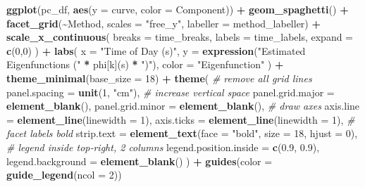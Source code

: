 \documentclass[
]{article}
\newenvironment{Shaded}{\begin{snugshade}}{\end{snugshade}}
\newcommand{\AttributeTok}[1]{\textcolor[rgb]{0.13,0.29,0.53}{#1}}
\newcommand{\CommentTok}[1]{\textcolor[rgb]{0.56,0.35,0.01}{\textit{#1}}}
\newcommand{\DecValTok}[1]{\textcolor[rgb]{0.00,0.00,0.81}{#1}}
\newcommand{\FloatTok}[1]{\textcolor[rgb]{0.00,0.00,0.81}{#1}}
\newcommand{\FunctionTok}[1]{\textcolor[rgb]{0.13,0.29,0.53}{\textbf{#1}}}
\newcommand{\NormalTok}[1]{#1}
\newcommand{\SpecialCharTok}[1]{\textcolor[rgb]{0.81,0.36,0.00}{\textbf{#1}}}
\newcommand{\StringTok}[1]{\textcolor[rgb]{0.31,0.60,0.02}{#1}}
\begin{document}
\begin{Shaded}
\begin{Highlighting}[]
\FunctionTok{ggplot}\NormalTok{(pc\_df, }\FunctionTok{aes}\NormalTok{(}\AttributeTok{y =}\NormalTok{ curve, }\AttributeTok{color =}\NormalTok{ Component)) }\SpecialCharTok{+}
  \FunctionTok{geom\_spaghetti}\NormalTok{() }\SpecialCharTok{+}
  \FunctionTok{facet\_grid}\NormalTok{(}\SpecialCharTok{\textasciitilde{}}\NormalTok{Method, }\AttributeTok{scales =} \StringTok{"free\_y"}\NormalTok{, }\AttributeTok{labeller =}\NormalTok{ method\_labeller) }\SpecialCharTok{+}
  \FunctionTok{scale\_x\_continuous}\NormalTok{(}
    \AttributeTok{breaks =}\NormalTok{ time\_breaks,}
    \AttributeTok{labels =}\NormalTok{ time\_labels,}
    \AttributeTok{expand =} \FunctionTok{c}\NormalTok{(}\DecValTok{0}\NormalTok{,}\DecValTok{0}\NormalTok{)}
\NormalTok{  ) }\SpecialCharTok{+}
  \FunctionTok{labs}\NormalTok{(}
    \AttributeTok{x =} \StringTok{"Time of Day (s)"}\NormalTok{,}
    \AttributeTok{y =} \FunctionTok{expression}\NormalTok{(}\StringTok{"Estimated Eigenfunctions ("} \SpecialCharTok{*}\NormalTok{ phi[k](s) }\SpecialCharTok{*} \StringTok{")"}\NormalTok{),}
    \AttributeTok{color =} \StringTok{"Eigenfunction"}
\NormalTok{  ) }\SpecialCharTok{+}
  \FunctionTok{theme\_minimal}\NormalTok{(}\AttributeTok{base\_size =} \DecValTok{18}\NormalTok{) }\SpecialCharTok{+}
  \FunctionTok{theme}\NormalTok{(}
    \CommentTok{\# remove all grid lines}
    \AttributeTok{panel.spacing =} \FunctionTok{unit}\NormalTok{(}\DecValTok{1}\NormalTok{, }\StringTok{"cm"}\NormalTok{),    }\CommentTok{\# increase vertical space}
    \AttributeTok{panel.grid.major =} \FunctionTok{element\_blank}\NormalTok{(),}
    \AttributeTok{panel.grid.minor =} \FunctionTok{element\_blank}\NormalTok{(),}
    \CommentTok{\# draw axes}
    \AttributeTok{axis.line  =} \FunctionTok{element\_line}\NormalTok{(}\AttributeTok{linewidth =} \DecValTok{1}\NormalTok{),}
    \AttributeTok{axis.ticks =} \FunctionTok{element\_line}\NormalTok{(}\AttributeTok{linewidth =} \DecValTok{1}\NormalTok{),}
    \CommentTok{\# facet labels bold}
    \AttributeTok{strip.text =} \FunctionTok{element\_text}\NormalTok{(}\AttributeTok{face =} \StringTok{"bold"}\NormalTok{, }\AttributeTok{size =} \DecValTok{18}\NormalTok{, }\AttributeTok{hjust =} \DecValTok{0}\NormalTok{),}
    \CommentTok{\# legend inside top‐right, 2 columns}
    \AttributeTok{legend.position.inside =} \FunctionTok{c}\NormalTok{(}\FloatTok{0.9}\NormalTok{, }\FloatTok{0.9}\NormalTok{),}
    \AttributeTok{legend.background =} \FunctionTok{element\_blank}\NormalTok{()}
\NormalTok{  ) }\SpecialCharTok{+}
  \FunctionTok{guides}\NormalTok{(}\AttributeTok{color =} \FunctionTok{guide\_legend}\NormalTok{(}\AttributeTok{ncol =} \DecValTok{2}\NormalTok{))}
\end{Highlighting}
\end{Shaded}
\end{document}
